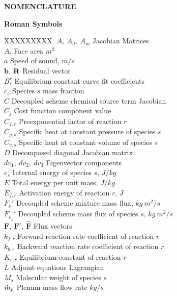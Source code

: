 \begin{center}
  \textbf{NOMENCLATURE}
\end{center}

\textbf{Roman Symbols}
\bigskip
\begin{tabbing}
  XXXXXXXXX \= \kill%
  $A,\ A_d,\ A_m$ \> Jacobian Matrices \\
  $A_i$ \> Face area $m^2$ \\
  $a$ \> Speed of sound, $m/s$ \\
  $\mathbf{b}$, $\mathbf R_{}$ \> Residual vector \\
  $B^{r}_{i}$ \> Equilibrium constant curve fit coefficients \\
  $c_s$ \> Species $s$ mass fraction \\
  $C$ \> Decoupled scheme chemical source term Jacobian \\
  $C_j$ \> Cost function component value \\
  $C_{f,r}$ \> Preexponential factor of reaction $r$ \\
  $C_{p,s}$ \> Specific heat at constant pressure of species $s$ \\
  $C_{v,s}$ \> Specific heat at constant volume of species $s$ \\
  $D$ \> Decomposed diagonal Jacobian matrix \\
  $dv_1,\ dv_2,\ dv_3$ \> Eigenvector components \\
  $e_s$ \> Internal energy of species $s$, $J/kg$ \\
  $E$ \> Total energy per unit mass, $J/kg$ \\
  $E_{f,r}$\> Activation energy of reaction $r$, $J$ \\
  $F_\rho'$\> Decoupled scheme mixture mass flux, $kg\ m^2/s$ \\
  $F_{\rho_s}'$\> Decoupled scheme mass flux of species $s$, $kg\ m^2/s$ \\
  $\mathbf{F},\ \mathbf{F}',\ \mathbf{\hat{F}}$ \> Flux vectors \\
  $k_{f,r}$ \> Forward reaction rate coefficient of reaction $r$ \\
  $k_{b,r}$ \> Backward reaction rate coefficient of reaction $r$ \\
  $K_{c,r}$ \> Equilibrium constant of reaction $r$ \\
  $L$ \> Adjoint equations Lagrangian \\
  $M_s$ \> Molecular weight of species $s$ \\
  $\dot{m}_p$ \> Plenum mass flow rate $kg/s$ \\

\end{tabbing}
